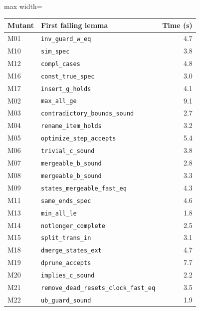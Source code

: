 \begin{adjustbox}{max width=\textwidth}\begin{tabular}{@{}llr@{}}
\toprule
Mutant & First failing lemma & Time (s) \\
\midrule
M01 & \texttt{inv\_guard\_w\_eq} & 4.7 \\
M10 & \texttt{sim\_spec} & 3.8 \\
M12 & \texttt{compl\_cases} & 4.8 \\
M16 & \texttt{const\_true\_spec} & 3.0 \\
M17 & \texttt{insert\_g\_holds} & 4.1 \\
\midrule
M02 & \texttt{max\_all\_ge} & 9.1 \\
M03 & \texttt{contradictory\_bounds\_sound} & 2.7 \\
M04 & \texttt{rename\_item\_holds} & 3.2 \\
M05 & \texttt{optimize\_step\_accepts} & 5.4 \\
M06 & \texttt{trivial\_c\_sound} & 3.8 \\
M07 & \texttt{mergeable\_b\_sound} & 2.8 \\
M08 & \texttt{mergeable\_b\_sound} & 3.3 \\
M09 & \texttt{states\_mergeable\_fast\_eq} & 4.3 \\
M11 & \texttt{same\_ends\_spec} & 4.6 \\
M13 & \texttt{min\_all\_le} & 1.8 \\
M14 & \texttt{notlonger\_complete} & 2.5 \\
M15 & \texttt{split\_trans\_in} & 3.1 \\
M18 & \texttt{dmerge\_states\_ext} & 4.7 \\
M19 & \texttt{dprune\_accepts} & 7.7 \\
M20 & \texttt{implies\_c\_sound} & 2.2 \\
M21 & \texttt{remove\_dead\_resets\_clock\_fast\_eq} & 3.5 \\
M22 & \texttt{ub\_guard\_sound} & 1.9 \\
\bottomrule
\end{tabular}\end{adjustbox}
